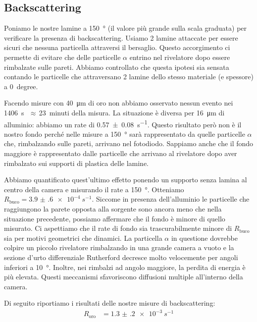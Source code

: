 \subsection{Backscattering}

Poniamo le nostre lamine a \SI{150}{\degree} (il valore più grande sulla scala graduata) per verificare la presenza di backscattering. Usiamo 2 lamine attaccate per essere sicuri che nessuna particella attraversi il bersaglio. Questo accorgimento ci permette di evitare che delle particelle $\alpha$ entrino nel rivelatore dopo essere rimbalzate sulle pareti. Abbiamo controllato che questa ipotesi sia sensata contando le particelle che attraversano 2 lamine dello stesso materiale (e spessore) a \SI{0}{degree}.

Facendo misure con \SI{40}{\micro m} di oro non abbiamo osservato nessun evento nei \SI{1406}s\,$\approx$\,\SI{23}{minuti} della misura. La situazione è diversa per \SI{16}{\micro m} di alluminio: abbiamo un rate di \SI{0.57(8)}{s^{-1}}.
Questo risultato però non è il nostro fondo perché nelle misure a \SI{150}{\degree} sarà rappresentato da quelle particelle $\alpha$ che, rimbalzando sulle pareti, arrivano nel fotodiodo. Sappiamo anche che il fondo maggiore è rappresentato dalle particelle che arrivano al rivelatore dopo aver rimbalzato sui supporti di plastica delle lamine.

Abbiamo quantificato quest'ultimo effetto ponendo un supporto senza lamina al centro della camera e misurando il rate a \SI{150}{\degree}. Otteniamo $R_{\text{buco}}=\SI{3.9(6)e-4}{s^{-1}}$.
Siccome in presenza dell'alluminio le particelle che raggiungono la parete opposta alla sorgente sono ancora meno che nella situazione precedente, possiamo affermare che il fondo è minore di quello misurato. Ci aspettiamo che il rate di fondo sia trascurabilmente minore di $R_{\text{buco}}$ sia per motivi geometrici che dinamici. La particella $\alpha$ in questione dovrebbe colpire un piccolo rivelatore rimbalzando in una grande camera a vuoto e la sezione d'urto differenziale Rutherford decresce molto velocemente per angoli inferiori a \SI{10}{\degree}. Inoltre, nei rimbalzi ad angolo maggiore, la perdita di energia è più elevata. Questi meccanismi sfavoriscono diffusioni multiple all'interno della camera.

Di seguito riportiamo i risultati delle nostre misure di backscattering:
\begin{align*}
R_{\text{oro}} &= \SI{1.3(2)e-3}{s^{-1}}
\end{align*}